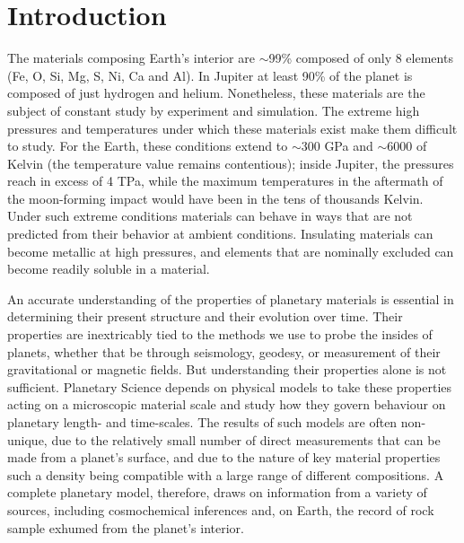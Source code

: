 \chapter{Introduction}\label{chap1}

The materials composing Earth's interior are $\sim$99\% composed of only 8 elements (Fe,
O, Si, Mg, S, Ni, Ca and Al). In Jupiter at least 90\% of the planet is composed
of just hydrogen and helium.  Nonetheless, these materials are the subject of
constant study by experiment and simulation. The extreme high pressures and
temperatures under which these materials exist make them difficult to study.
For the Earth, these conditions extend to $\sim$300 GPa and $\sim$6000 of Kelvin
\citep{alfe2009} (the temperature value remains contentious); inside Jupiter,
the pressures reach in excess of 4 TPa, while the maximum temperatures in the
aftermath of the moon-forming impact would  have been in the tens of thousands
Kelvin. Under such extreme conditions materials can behave in ways that are
not predicted from their behavior at ambient conditions. Insulating
materials can become metallic at high pressures, and elements that are
nominally excluded can become readily soluble in a material.

An accurate understanding of the properties of planetary materials is essential
in determining their present structure and their evolution over time. Their
properties are inextricably tied to the methods we use to probe the insides of
planets, whether that be through seismology, geodesy, or measurement of their
gravitational or magnetic fields. But understanding their properties alone is
not sufficient. Planetary Science depends on physical models to take these
properties acting on a microscopic material scale and study how they govern
behaviour on planetary length- and time-scales. The results of such models are
often non-unique, due to the relatively small number of direct measurements
that can be made from a planet's surface, and due to the nature of key material
properties such a density  being compatible with a large range of different
compositions. A complete planetary model, therefore, draws on information from a
variety of sources, including cosmochemical inferences and, on Earth, the
record of rock sample exhumed from the planet's interior.

